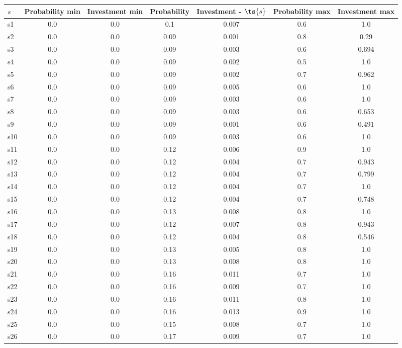 \documentclass{article}
\begin{document}
\noindent\begin{tabular}{|l|c|c|c|c|c|c|}
\hline
$s$& Probability min & Investment min & Probability & Investment - $\ts{s}$ & Probability max & Investment max\\
\hline
s1 &0.0 & 0.0 & 0.1 & 0.007 & 0.6 & 1.0\\
\hline
s2 &0.0 & 0.0 & 0.09 & 0.001 & 0.8 & 0.29\\
\hline
s3 &0.0 & 0.0 & 0.09 & 0.003 & 0.6 & 0.694\\
\hline
s4 &0.0 & 0.0 & 0.09 & 0.002 & 0.5 & 1.0\\
\hline
s5 &0.0 & 0.0 & 0.09 & 0.002 & 0.7 & 0.962\\
\hline
s6 &0.0 & 0.0 & 0.09 & 0.005 & 0.6 & 1.0\\
\hline
s7 &0.0 & 0.0 & 0.09 & 0.003 & 0.6 & 1.0\\
\hline
s8 &0.0 & 0.0 & 0.09 & 0.003 & 0.6 & 0.653\\
\hline
s9 &0.0 & 0.0 & 0.09 & 0.001 & 0.6 & 0.491\\
\hline
s10 &0.0 & 0.0 & 0.09 & 0.003 & 0.6 & 1.0\\
\hline
s11 &0.0 & 0.0 & 0.12 & 0.006 & 0.9 & 1.0\\
\hline
s12 &0.0 & 0.0 & 0.12 & 0.004 & 0.7 & 0.943\\
\hline
s13 &0.0 & 0.0 & 0.12 & 0.004 & 0.7 & 0.799\\
\hline
s14 &0.0 & 0.0 & 0.12 & 0.004 & 0.7 & 1.0\\
\hline
s15 &0.0 & 0.0 & 0.12 & 0.004 & 0.7 & 0.748\\
\hline
s16 &0.0 & 0.0 & 0.13 & 0.008 & 0.8 & 1.0\\
\hline
s17 &0.0 & 0.0 & 0.12 & 0.007 & 0.8 & 0.943\\
\hline
s18 &0.0 & 0.0 & 0.12 & 0.004 & 0.8 & 0.546\\
\hline
s19 &0.0 & 0.0 & 0.13 & 0.005 & 0.8 & 1.0\\
\hline
s20 &0.0 & 0.0 & 0.13 & 0.008 & 0.8 & 1.0\\
\hline
s21 &0.0 & 0.0 & 0.16 & 0.011 & 0.7 & 1.0\\
\hline
s22 &0.0 & 0.0 & 0.16 & 0.009 & 0.7 & 1.0\\
\hline
s23 &0.0 & 0.0 & 0.16 & 0.011 & 0.8 & 1.0\\
\hline
s24 &0.0 & 0.0 & 0.16 & 0.013 & 0.9 & 1.0\\
\hline
s25 &0.0 & 0.0 & 0.15 & 0.008 & 0.7 & 1.0\\
\hline
s26 &0.0 & 0.0 & 0.17 & 0.009 & 0.7 & 1.0\\

\end{tabular}
\end{document}
